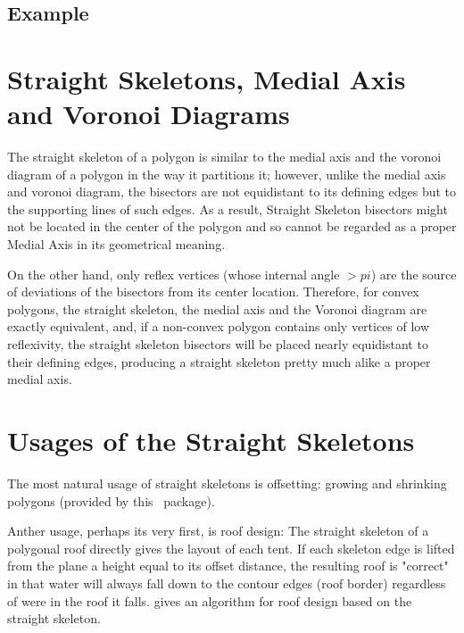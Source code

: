 \subsection{Example}



\section{Straight Skeletons, Medial Axis and Voronoi Diagrams}  

The straight skeleton of a polygon is similar to the medial
axis and the voronoi diagram of a polygon in the way it partitions
it; however, unlike the medial axis and voronoi diagram, the
bisectors are not equidistant to its defining edges but to the
supporting lines of such edges. As a result, Straight Skeleton
bisectors might not be located in the center of the polygon and so
cannot be regarded as a proper Medial Axis in its geometrical meaning.

On the other hand, only reflex vertices (whose internal angle $>pi$)
are the source of deviations of the bisectors from its center
location. Therefore, for convex polygons, the straight skeleton, the
medial axis and the Voronoi diagram are exactly equivalent,
and, if a non-convex polygon contains only vertices of low
reflexivity, the straight skeleton bisectors will be placed nearly
equidistant to their defining edges, producing a straight skeleton
pretty much alike a proper medial axis.


\section{Usages of the Straight Skeletons}  

The most natural usage of straight skeletons is offsetting: growing and shrinking polygons (provided by this  \cgal\ package).

Anther usage, perhaps its very first, is roof design: The straight skeleton of a polygonal roof directly gives the layout of each tent. If each skeleton edge is lifted from the plane a height equal to its offset distance, the resulting roof is "correct" in that water will always fall down to the contour edges (roof border) regardless of were in the roof it falls. \cite{cgal:ld-agrm-03} gives an algorithm for roof design based on the straight skeleton.

